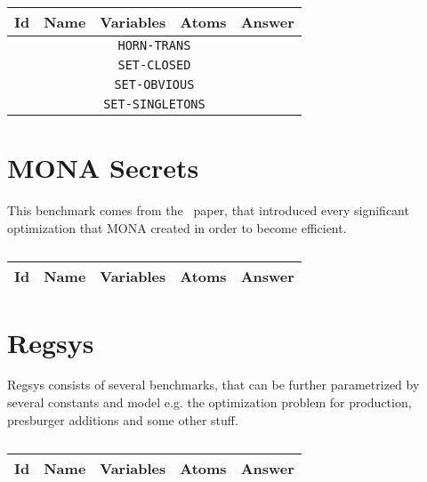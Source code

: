 \begin{table}[h!]
 \centering
  \caption{}\label{tab:bench-dwina}
  \begin{tabular}{l l r r r}
  \hline
  \textbf{Id} & \textbf{Name} & \textbf{Variables} & \textbf{Atoms} & \textbf{Answer} \\
  \hline
  \hline
  \multicolumn{5}{c}{\texttt{HORN-TRANS}}\\
  \hline
  
  \hline
  \multicolumn{5}{c}{\texttt{SET-CLOSED}}\\
  \hline
  
  \hline
  \multicolumn{5}{c}{\texttt{SET-OBVIOUS}}\\
  \hline
  
  \hline
  \multicolumn{5}{c}{\texttt{SET-SINGLETONS}}\\
  \hline
  
  \hline
  \end{tabular}
\end{table}

\newpage

\section{MONA Secrets}

This benchmark comes from the~\cite{mona:secrets} paper, that introduced every significant
optimization that MONA created in order to become efficient.

\begin{table}[h!]
 \centering
  \caption{}{\label{tab:bench-secrets}}
  \begin{tabular}{l l r r r}
  \hline
  \textbf{Id} & \textbf{Name} & \textbf{Variables} & \textbf{Atoms} & \textbf{Answer} \\
  \hline
  \hline
  
  \hline
  \end{tabular}
\end{table}

\section{Regsys}

Regsys consists of several benchmarks, that can be further parametrized by several constants
and model e.g. the optimization problem for production, presburger additions and some
other stuff.

\begin{table}[h!]
 \centering
  \caption{}{\label{tab:bench-regsys}}
  \begin{tabular}{l l r r r}
  \hline
  \textbf{Id} & \textbf{Name} & \textbf{Variables} & \textbf{Atoms} & \textbf{Answer} \\
  \hline
  \hline
  
  \hline
  \end{tabular}
\end{table}
